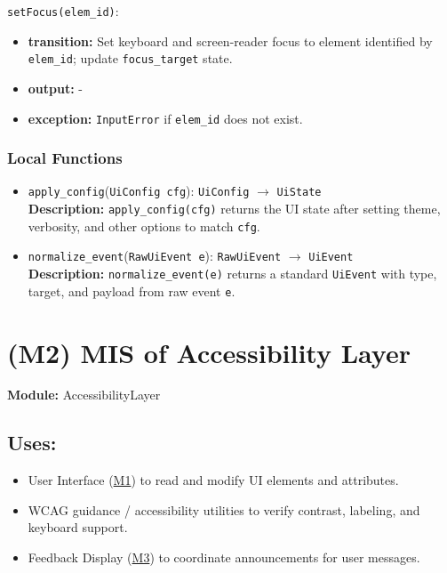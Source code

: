 \documentclass[12pt, titlepage]{article}
\begin{document}
\noindent\texttt{setFocus(elem\_id)}:
\begin{itemize}
  \item \textbf{transition:} Set keyboard and screen-reader focus to element identified by \texttt{elem\_id}; update \texttt{focus\_target} state.
  \item \textbf{output:} -
  \item \textbf{exception:} \texttt{InputError} if \texttt{elem\_id} does not exist.
\end{itemize}

\subsubsection{Local Functions}

\begin{itemize}
  \item \texttt{apply\_config}(\texttt{UiConfig cfg}): \texttt{UiConfig} $\rightarrow$ \texttt{UiState} \\
  \textbf{Description:} \texttt{apply\_config(cfg)} returns the UI state after setting theme, verbosity, and other options to match \texttt{cfg}.

  \item \texttt{normalize\_event}(\texttt{RawUiEvent e}): \texttt{RawUiEvent} $\rightarrow$ \texttt{UiEvent} \\
  \textbf{Description:} \texttt{normalize\_event(e)} returns a standard \texttt{UiEvent} with type, target, and payload from raw event \texttt{e}.
\end{itemize}

\newpage
\section{(M2) MIS of Accessibility Layer} \label{M2}
\textbf{Module:} AccessibilityLayer

\subsection{Uses:}
\begin{itemize}
  \item User Interface (\hyperref[M1]{M1}) to read and modify UI elements and attributes.
  \item WCAG guidance / accessibility utilities to verify contrast, labeling, and keyboard support.
  \item Feedback Display (\hyperref[M3]{M3}) to coordinate announcements for user messages.
\end{itemize}
\end{document}
